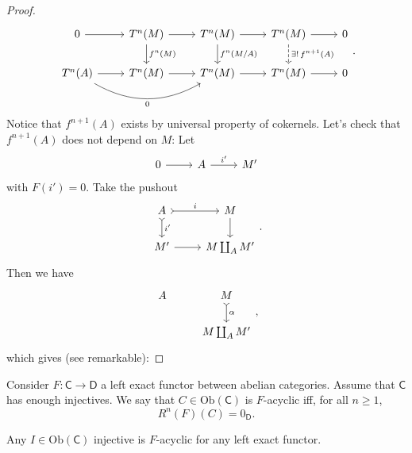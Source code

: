 \documentclass[../Main]{subfiles}
\begin{document}
\begin{proof}
\begin{equation}
	\begin{tikzcd}
		0 \arrow[r, "", rightarrow] &
		T^{n}(M) \arrow[r, "", rightarrow] 
		\arrow[d, "f^n(M)", rightarrow] &
		T^{n}(M) \arrow[r, "", rightarrow] 
		\arrow[d, "f^n(M/A)", rightarrow] &
		T^{n}(M) \arrow[r, "", rightarrow] 
		\arrow[d, "\exists !\, f^{n+1}(A)", dashrightarrow] &
		0\\
		T^{n}(A) \arrow[r, "", rightarrow] 
						  \arrow[rr, "0"', rightarrow, bend right] &
		T^{n}(M) \arrow[r, "", rightarrow] &
		T^{n}(M) \arrow[r, "", rightarrow] &
		T^{n}(M) \arrow[r, "", rightarrow] &
		0
	\end{tikzcd}
	.\end{equation} 
	Notice that $f^{n+1}(A)$ exists by universal property
	of cokernels.
	Let's check that $f^{n+1}(A)$ does not depend on $M$:
	Let
	\begin{equation}
	\begin{tikzcd}
		0 \arrow[r, "", rightarrow] &
		A \arrow[r, "i'", rightarrow] &
		M'
	\end{tikzcd}
	\end{equation} 
	with $F(i') = 0$.
	Take the pushout
	\begin{equation}
	\begin{tikzcd}
		A \arrow[r, "i", rightarrowtail] 
		\arrow[d, "i'", rightarrowtail] &
		M \arrow[d, "", rightarrow] \\
		M' \arrow[r, "", rightarrow] &
		M \coprod_A M'
	\end{tikzcd}
	.\end{equation} 
	Then we have
	\begin{equation}
		\begin{tikzcd}
			A &
	M \arrow[d, "\alpha", rightarrowtail] \\
	&
	M \coprod_A M'
		\end{tikzcd}
	,\end{equation}
	which gives (see remarkable):
\end{proof}

\begin{defn}[]
	Consider $F\colon \mathsf{C} \to \mathsf{D}$ a left exact functor between
	abelian categories.
	Assume that $\mathsf{C}$ has enough injectives.
	We say that $C \in \mathrm{Ob} \left(\mathsf{C}\right)$ is $F$-acyclic iff,
	for all $n \geq 1$,
	\begin{equation}
		R^n(F)(C) = 0_{\mathsf{D}}.
	\end{equation}
\end{defn}
\begin{rem}[]
	Any $I \in \mathrm{Ob} \left(\mathsf{C}\right)$ injective is 
	$F$-acyclic for any left exact functor.
\end{rem}
\end{document}
